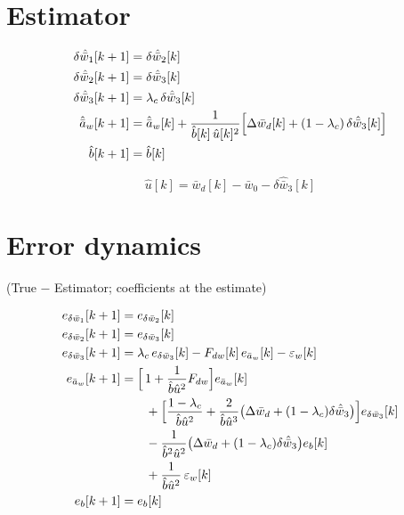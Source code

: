 \documentclass[11pt,a4paper,fontset=none]{ctexart}
\newcommand{\ba}{\bar{a}}
\newcommand{\bw}{\bar{w}}
\begin{document}
\section{Estimator}

\begin{align*}
\delta\hat{\bw}_1[k+1] &= \delta\hat{\bw}_2[k] \\
\delta\hat{\bw}_2[k+1] &= \delta\hat{\bw}_3[k] \\
\delta\hat{\bw}_3[k+1] &= \lambda_c\,\delta\hat{\bw}_3[k] \\
\hat{\ba}_w[k+1]       &= \hat{\ba}_w[k]
  + \frac{1}{\hat{b}[k]\,\hat{u}[k]^{2}}
    \Bigl[\Delta\bw_d[k] + (1-\lambda_c)\,\delta\hat{\bw}_3[k]\Bigr] \\
\hat{b}[k+1]           &= \hat{b}[k]
\end{align*}

\begin{equation*}
\hat{u}[k] = \bw_d[k] - \bw_0 - \delta\hat{\bw}_3[k]
\end{equation*}

\section{Error dynamics}

(True $-$ Estimator; coefficients at the estimate)

\begin{align*}
e_{\delta\bw_1}[k+1] &= e_{\delta\bw_2}[k] \\
e_{\delta\bw_2}[k+1] &= e_{\delta\bw_3}[k] \\
e_{\delta\bw_3}[k+1] &= \lambda_c\,e_{\delta\bw_3}[k]
  - F_{dw}[k]\,e_{\ba_w}[k] - \varepsilon_w[k] \\
e_{\ba_w}[k+1] &= \Bigl[\,1 + \frac{1}{\hat{b}\hat{u}^{2}}F_{dw}\Bigr] e_{\ba_w}[k] \\
  &\qquad + \Bigl[\frac{1-\lambda_c}{\hat{b}\hat{u}^{2}}
      + \frac{2}{\hat{b}\hat{u}^{3}}
        \bigl(\Delta\bw_d + (1-\lambda_c)\delta\hat{\bw}_3\bigr)\Bigr]
      e_{\delta\bw_3}[k] \\
  &\qquad - \frac{1}{\hat{b}^{2}\hat{u}^{2}}
      \bigl(\Delta\bw_d + (1-\lambda_c)\delta\hat{\bw}_3\bigr) e_b[k] \\
  &\qquad + \frac{1}{\hat{b}\hat{u}^{2}}\,\varepsilon_w[k] \\
e_b[k+1] &= e_b[k]
\end{align*}
\end{document}
